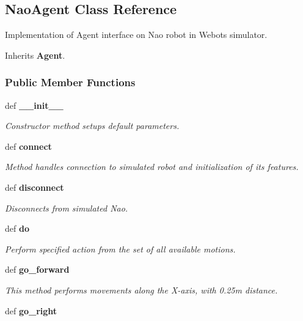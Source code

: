 \subsection{Nao\+Agent Class Reference}
\label{class_nao_agent_1_1_nao_agent}


Implementation of Agent interface on Nao robot in Webots simulator.  




Inherits {\bf Agent}.

\subsubsection*{Public Member Functions}
\begin{DoxyCompactItemize}
\item 
def {\bf \+\_\+\+\_\+init\+\_\+\+\_\+}\label{class_nao_agent_1_1_nao_agent_ac775ee34451fdfa742b318538164070e}

\begin{DoxyCompactList}\small\item\em Constructor method setups default parameters. \end{DoxyCompactList}\item 
def {\bf connect}
\begin{DoxyCompactList}\small\item\em Method handles connection to simulated robot and initialization of its features. \end{DoxyCompactList}\item 
def {\bf disconnect}\label{class_nao_agent_1_1_nao_agent_afab97b4023d6e30d95344406b3655983}

\begin{DoxyCompactList}\small\item\em Disconnects from simulated Nao. \end{DoxyCompactList}\item 
def {\bf do}
\begin{DoxyCompactList}\small\item\em Perform specified action from the set of all available motions. \end{DoxyCompactList}\item 
def {\bf go\+\_\+forward}\label{class_nao_agent_1_1_nao_agent_a74f88e9c727035ad050d4a1b5e16eb5f}

\begin{DoxyCompactList}\small\item\em This method performs movements along the X-\/axis, with 0.\+25m distance. \end{DoxyCompactList}\item 
def {\bf go\+\_\+right}\label{class_nao_agent_1_1_nao_agent_a1825cf4236b693f347db9c793206049c}


\end{DoxyCompactItemize}
